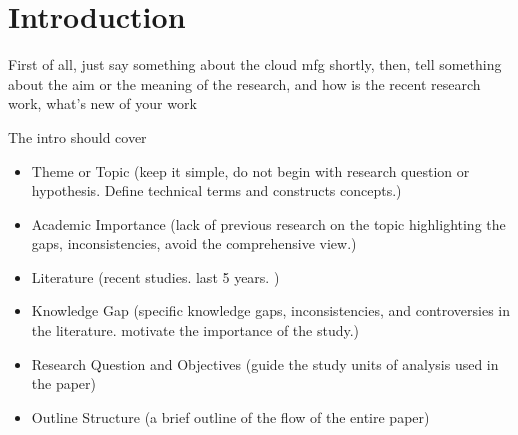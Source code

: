 \section{Introduction}
First of all, just say something about the cloud mfg shortly,
then, tell something about the aim or the meaning of the research,
and how is the recent research work, what's new of your work 


The intro should cover 
\begin{itemize}
	\item Theme or Topic (keep it simple, do not begin with research question or hypothesis. Define technical terms and constructs concepts.)
	\item Academic Importance (lack of previous research on the topic highlighting the gaps, inconsistencies, avoid the comprehensive view.)
	\item Literature (recent studies. last 5 years. )
	\item Knowledge Gap (specific knowledge gaps, inconsistencies, and controversies in the literature. motivate the importance of the study.)
	\item Research Question and Objectives (guide the study units of analysis used in the paper)
	\item Outline Structure (a brief outline of the flow of the entire paper)
\end{itemize}
